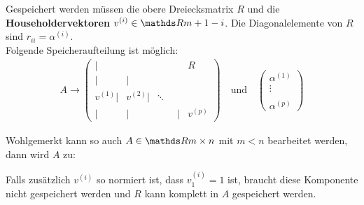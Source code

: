 



Gespeichert werden müssen die obere Dreiecksmatrix $R$ und die 
\textbf{Householdervektoren} 
$v^{(i)}\in \R{m+1-i}$.
Die Diagonalelemente von $R$ sind $r_{ii} = \alpha^{(i)}$. \\
Folgende Speicheraufteilung ist möglich:
\begin{gather*}
A \longrightarrow \left(
\begin{array}{rrrrr}
|&&& R \\
|&| \\
v^{(1)}| & v^{(2)}|&\ddots ~~\\
| &|&\phantom{v^{(i)}}|& v^{(p)}			
\end{array}
\right)
\quad \text{und} \quad 
\begin{pmatrix}
\alpha^{(1)} \\ \vdots \\ \\ \alpha^{(p)}
\end{pmatrix}
\end{gather*}

Wohlgemerkt kann so auch $A\in \R{m\times n}$ mit $m<n$ bearbeitet werden,
dann wird $A$ zu:

\label{im4.4.5}

Falls zusätzlich $v^{(i)}$ so normiert ist,
dass $v_1^{(i)} = 1$ ist, braucht diese Komponente nicht gespeichert werden 
und $R$ kann komplett in $A$ gespeichert werden.



